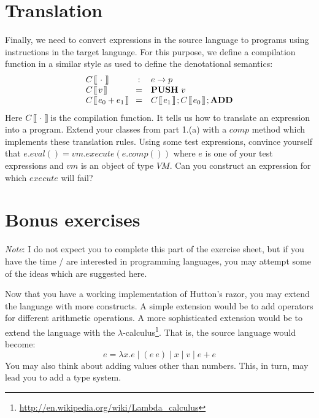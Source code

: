\documentclass[10pt,a4paper,fleqn]{exam}
\newcommand {\lbrac} {\makebox[0pt]{[\kern-1ex[}}
\newcommand {\rbrac} {\makebox[0pt]{]\kern-1ex]}}
\newcommand{\denote}[1]{\lbrac~#1~\rbrac}
\begin{document}
\begin{questions}
\section{Translation}

\question Finally, we need to convert expressions in the source language to programs using instructions in the target language. For this purpose, we define a compilation function in a similar style as used to define the denotational semantics:
\begin{displaymath}
\begin{array}{lcl}
C~\denote{\cdot} & : & e \to p \\
C~\denote{v} & = & \mathbf{PUSH}~v \\
C~\denote{e_0 + e_1} & = & C~\denote{e_1}~;C~\denote{e_0}~;\mathbf{ADD} \\
\end{array}
\end{displaymath}
Here $C~\denote{\cdot}$ is the compilation function. It tells us how to translate an expression into a program. Extend your classes from part 1.(a) with a $\mathit{comp}$ method which implements these translation rules.
\question Using some test expressions, convince yourself that $e.eval() = vm.execute(e.comp())$ where $e$ is one of your test expressions and $vm$ is an object of type $\mathit{VM}$. Can you construct an expression for which $\mathit{execute}$ will fail?

\section{Bonus exercises}

\emph{Note}: I do not expect you to complete this part of the exercise sheet, but if you have the time / are interested in programming languages, you may attempt some of the ideas which are suggested here.

Now that you have a working implementation of Hutton's razor, you may extend the language with more constructs. A simple extension would be to add operators for different arithmetic operations. A more sophisticated extension would be to extend the language with the $\lambda$-calculus\footnote{\url{http://en.wikipedia.org/wiki/Lambda_calculus}}. That is, the source language would become:
\begin{displaymath}
e = \lambda x.e \mid (e~e) \mid x \mid v \mid e+e
\end{displaymath}
You may also think about adding values other than numbers. This, in turn, may lead you to add a type system.

\end{questions}
\end{document}
